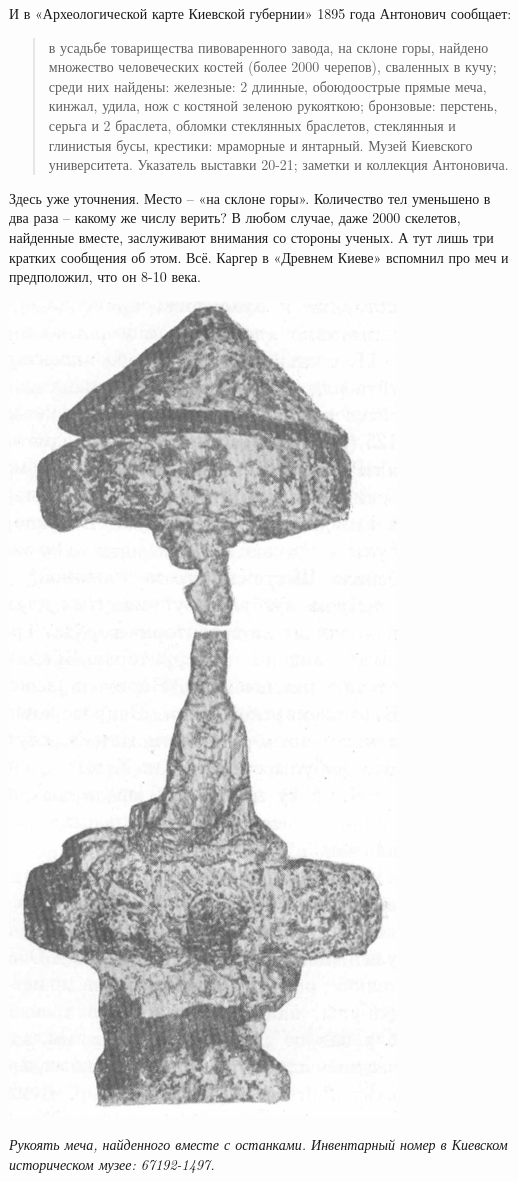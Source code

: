 И в «Археологической карте Киевской губернии»\cite{antonovich01} 1895 года Антонович сообщает:

\begin{quotation}
в усадьбе товарищества пивоваренного завода, на склоне горы, найдено множество человеческих костей (более 2000 черепов), сваленных в кучу; среди них найдены: железные: 2 длинные, обо\-юдоострые прямые меча, кинжал, удила, нож с костяной зеленою рукояткою; бронзовые: перстень, серьга и 2 браслета, обломки стеклянных браслетов, стеклянныя и глинистыя бусы, крестики: мраморные и янтарный. Музей Киевского университета. Указатель выставки 20-21; заметки и коллекция Антоновича.
\end{quotation}

Здесь уже уточнения. Место – «на склоне горы». Количество тел уменьшено в два раза – какому же числу верить? В любом случае, даже 2000 скелетов, найденные вместе, заслуживают внимания со стороны ученых. А тут лишь три кратких сообщения об этом. Всё. Каргер в «Древнем Киеве»\cite{karger01} вспомнил про меч и предположил, что он 8-10 века.

\begin{center}
\includegraphics[width=0.45\linewidth]{chast-kirvys/lys02/4000-mech.png}

\textit{Рукоять меча, найденного вместе с останками. Инвентарный номер в Киевском историческом музее: 67192-1497.}
\end{center}

